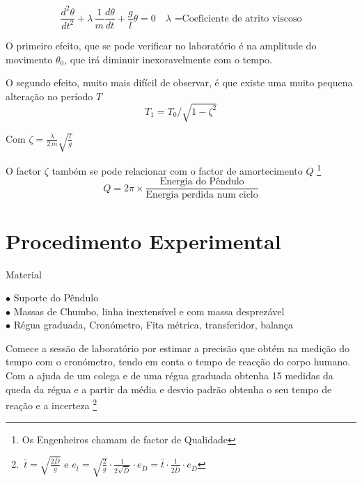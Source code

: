 \documentclass[a4paper,twoside,12pt]{article}      %
\begin{document}
\begin{equation}
	 \frac{d^2 \theta}{dt^2} + \lambda \, \frac{1}{m}  \frac{d \theta}{dt} + \frac{g}{l} \theta =0 \quad \lambda \text{ =Coeficiente de atrito viscoso}
\end{equation}

O primeiro efeito, que se pode verificar no laboratório é na amplitude do movimento $\theta_0$, que irá diminuir inexoravelmente com o tempo. 

O segundo efeito, muito mais difícil de observar, é que existe uma muito pequena alteração no período $T$
\begin{equation}
T_1= T_0 / \sqrt{1 - \zeta^2} 
\end{equation}

Com $ \zeta = \frac{\lambda}{2\, m} \sqrt{\frac{l}{g}}  $

O factor  $ \zeta $ também se pode relacionar com o factor de amortecimento $Q$ \footnote{Os Engenheiros chamam de factor de Qualidade} 
\begin{equation}
Q = 2 \pi \times \frac{\text{Energia do Pêndulo}}{\text{Energia perdida num ciclo}}
\end{equation}

\newpage
\section{\sf Procedimento Experimental}
{ \large Material }
 \begin{flushleft}
	 $\bullet$ Suporte do Pêndulo \\
	 $\bullet$ Massas de Chumbo, linha inextensível e com massa desprezável \\
	 $\bullet$ Régua graduada, Cronómetro, Fita métrica, transferidor, balança
\end{flushleft} 

Comece a sessão de laboratório por estimar a precisão que obtém na medição do tempo com o cronómetro, tendo em conta 
o tempo de reacção do corpo humano. 
Com a ajuda de um colega e de uma régua graduada obtenha 15 medidas da queda da régua e a partir da média e desvio padrão obtenha o seu tempo de reação e a incerteza \footnote{ $\,\overline{t}=\sqrt{\frac{2 \overline{D}}{g}}$ e   
$e_{\overline{t}}=\sqrt{\frac{2 }{g}} \cdot \frac{1}{2\sqrt{\overline{D}}} \cdot e_{\overline{D}}  
= \overline{t} \cdot \frac{1}{2\overline{D}} \cdot e_{\overline{D}} $ }
\end{document}
